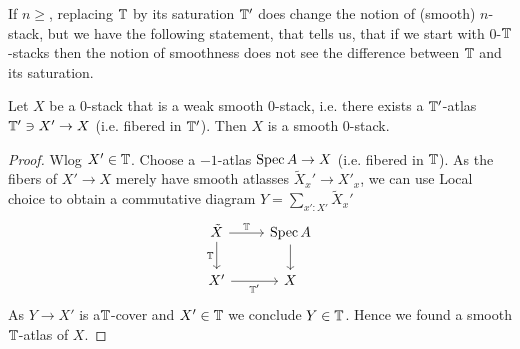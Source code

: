\documentclass{article}
\begin{document}
 If $n \ge $, replacing $\mathbb{T}$ by its saturation $\mathbb{T}'$ does change the notion of  (smooth) $n$-stack, but we have the following statement, that tells us, that if we start with  0-$\mathbb{T}$-stacks then the notion of smoothness does not see the difference between $\mathbb{T}$ and its saturation. 
\begin{prop}
    Let $X$ be a  0-stack that is a weak smooth 0-stack, i.e. there exists a $\mathbb{T}'$-atlas $\mathbb{T}' \ni X' \to X$ (i.e. fibered in $\mathbb{T}'$). Then $X$ is a smooth $0$-stack. 
\end{prop}
\begin{proof}
    Wlog $X' \in \mathbb{T}$. Choose a $-1$-atlas $\operatorname{Spec} A \to X$ (i.e. fibered in $\mathbb{T}$). As the fibers of $X' \to X$ merely have smooth atlasses $\tilde X_x' \to X'_x$, we can use Local choice to obtain a commutative diagram $Y = \sum_{x' : X'} \tilde X_x'$
\[\begin{tikzcd}
	{\tilde X} & {\Spec A} \\
	{X'} & X
	\arrow["\bT", from=1-1, to=1-2]
	\arrow["\bT"', from=1-1, to=2-1]
	\arrow[from=1-2, to=2-2]
	\arrow["{\bT'}"', from=2-1, to=2-2]
\end{tikzcd}\]
As $Y \to X'$ is a$\mathbb{T}$-cover and $X' \in \mathbb{T}$ we conclude $Y \in \mathbb{T}$. Hence we found a smooth $\mathbb{T}$-atlas of $X$. 
\end{proof}
\end{document}
